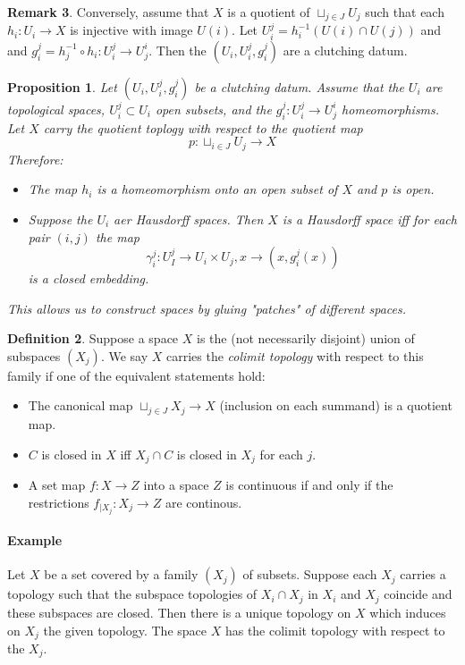 \documentclass[11pt,a4paper]{article}
\theoremstyle{definition}
\newtheorem{definition}{Definition}[section]
\newtheorem{remark}[definition]{Remark}
\theoremstyle{plain}
\newtheorem{proposition}[definition]{Proposition}
\theoremstyle{remark}
\begin{document}
\begin{remark}
Conversely, assume that $X$ is a quotient of $\sqcup_{j \in J} U_j$ such that each $h_i \colon U_i \to X$ 
is injective with image $U(i)$. Let $U_i^j = h_i^{-1} \left(U(i) \cap U(j)\right)$ and 
and $g_i^j = h_j^{-1} \circ h_i \colon U_i^j \to U_j^i$. Then the $(U_i, U_i^j, g_i^j)$ are a clutching datum. 

\begin{proposition}
  Let $(U_i, U_i^j, g_i^j)$ be a clutching datum. Assume that the $U_i$ are topological spaces, 
  $U_i^j \subset U_i$ open subsets, and the $g_i^j \colon U_i^j \to U_j^i$ homeomorphisms. Let $X$ carry 
  the quotient toplogy with respect to the quotient map 
  $$p \colon \sqcup_{i \in J} U_j \to X$$
  Therefore: 
  \begin{itemize}
    \item The map $h_i$ is a homeomorphism onto an open subset of $X$ and $p$ is open. 
    \item Suppose the $U_i$ aer Hausdorff spaces. Then $X$ is a Hausdorff space iff for each pair $(i,j)$ the map 
    $$\gamma_i^j \colon U_I^j \to U_i \times U_j, x \to (x, g_i^j(x))$$
    is a closed embedding. 
  \end{itemize}

  This allows us to construct spaces by gluing "patches" of different spaces. 
\end{proposition}

\begin{definition}
  Suppose a space $X$ is the (not necessarily disjoint) union of subspaces $(X_j)$. We say $X$ carries the 
  \emph{colimit topology} with respect to this family if one of the equivalent statements hold: 
  \begin{itemize}
    \item The canonical map $\sqcup_{j \in J} X_j \to X$ (inclusion on each summand) is a quotient map. 
    \item $C$ is closed in $X$ iff $X_j \cap C$ is closed in $X_j$ for each $j$. 
    \item A set map $f \colon X \to Z$ into a space $Z$ is continuous if and only if the restrictions 
    $f_{\mid X_j} \colon X_j \to Z$ are continous. 
  \end{itemize}
\end{definition}

\paragraph{Example} Let $X$ be a set covered by a family $(X_j)$ of subsets. Suppose each $X_j$ 
carries a topology such that the subspace topologies of $X_i \cap X_j$ in $X_i$ and $X_j$ coincide 
and these subspaces are closed. Then there is a unique topology on $X$ which induces on $X_j$ the given topology. 
The space $X$ has the colimit topology with respect to the $X_j$.


\end{remark}
\end{document}
